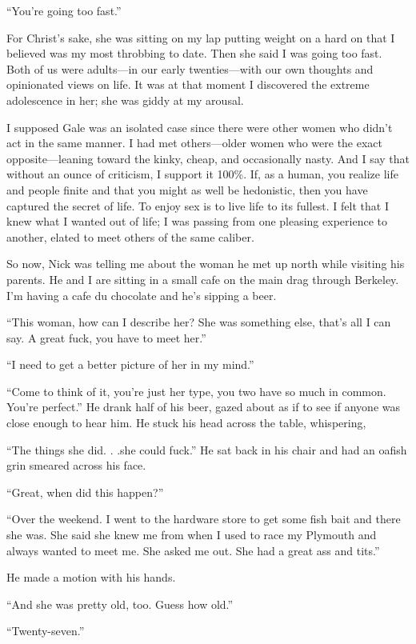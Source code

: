 ``You're going too fast.''

For Christ's sake, she was sitting on my lap putting weight on a hard on
that I believed was my most throbbing to date. Then she said I was going
too fast. Both of us were adults---in our early twenties---with our own
thoughts and opinionated views on life. It was at that moment I
discovered the extreme adolescence in her; she was giddy at my arousal.

I supposed Gale was an isolated case since there were other women who
didn't act in the same manner. I had met others---older women who were
the exact opposite---leaning toward the kinky, cheap, and occasionally
nasty. And I say that without an ounce of criticism, I support it 100\%.
If, as a human, you realize life and people finite and that you might as
well be hedonistic, then you have captured the secret of life. To enjoy
sex is to live life to its fullest. I felt that I knew what I wanted out
of life; I was passing from one pleasing experience to another, elated
to meet others of the same caliber.

So now, Nick was telling me about the woman he met up north while
visiting his parents. He and I are sitting in a small cafe on the main
drag through Berkeley. I'm having a cafe du chocolate and he's sipping a
beer.

``This woman, how can I describe her? She was something else, that's all
I can say. A great fuck, you have to meet her.''

``I need to get a better picture of her in my mind.''

``Come to think of it, you're just her type, you two have so much in
common. You're perfect.'' He drank half of his beer, gazed about as if
to see if anyone was close enough to hear him. He stuck his head across
the table, whispering,

``The things she did. . .she could fuck.'' He sat back in his chair and
had an oafish grin smeared across his face.

``Great, when did this happen?''

``Over the weekend. I went to the hardware store to get some fish bait
and there she was. She said she knew me from when I used to race my
Plymouth and always wanted to meet me. She asked me out. She had a great
ass and tits.''

He made a motion with his hands.

``And she was pretty old, too. Guess how old.''

``Twenty-seven.''

